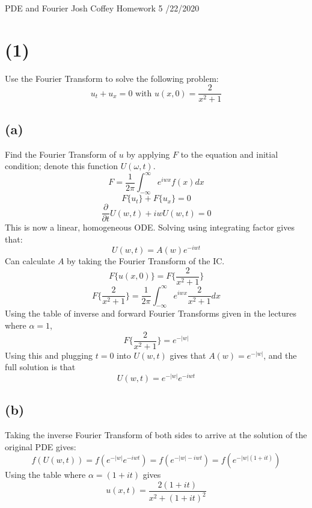 \documentclass[preview,12pt]{article}
\begin{document}
\noindent PDE and Fourier\newline
Josh Coffey \newline
Homework 5 /22/2020 \newline

\section*{(1)}
    Use the Fourier Transform to solve the following problem:
    $$u_t+u_x=0 \textrm{ with } u(x,0)=\frac{2}{x^2+1}$$
    \subsection*{(a)}
        Find the Fourier Transform of $u$ by applying $F$ to the equation and initial condition; denote this function $U(\omega,t).$
        $$F=\frac{1}{2\pi}\int_{-\infty}^\infty e^{iwx}f(x)dx$$
        $$F\{u_t\}+F\{u_x\}=0$$
        $$\frac{\partial}{\partial t}U(w,t)+iwU(w,t)=0$$
        This is now a linear, homogeneous ODE. Solving using integrating factor gives that:
        $$U(w,t)=A(w)e^{-iwt}$$
        Can calculate $A$ by taking the Fourier Transform of the IC.
        $$F\{u(x,0)\}=F\{\frac{2}{x^2+1}\}$$
        $$F\{\frac{2}{x^2+1}\}=\frac{1}{2\pi}\int_{-\infty}^\infty e^{iwx}\frac{2}{x^2+1}dx$$
        Using the table of inverse and forward Fourier Transforms given in the lectures where $\alpha=1$, 
        $$F\{\frac{2}{x^2+1}\}=e^{-|w|}$$
        Using this and plugging $t=0$ into $U(w,t)$ gives that $A(w)=e^{-|w|}$, and the full solution is that
        $$U(w,t)=e^{-|w|}e^{-iwt}$$
    \subsection*{(b)}
        Taking the inverse Fourier Transform of both sides to arrive at the solution of the original PDE gives:
        $$f(U(w,t))=f(e^{-|w|}e^{-iwt})=f(e^{-|w|-iwt})=f(e^{-|w|(1+it)})$$
        Using the table where $\alpha=(1+it)$ gives 
        $$u(x,t)=\frac{2(1+it)}{x^2+(1+it)^2}$$
        
\end{document}
